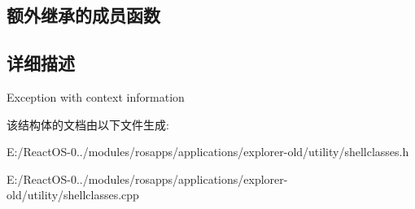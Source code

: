 \subsection*{额外继承的成员函数}


\subsection{详细描述}
Exception with context information 

该结构体的文档由以下文件生成\+:\begin{DoxyCompactItemize}
\item 
E\+:/\+React\+O\+S-\/0../modules/rosapps/applications/explorer-\/old/utility/shellclasses.\+h\item 
E\+:/\+React\+O\+S-\/0../modules/rosapps/applications/explorer-\/old/utility/shellclasses.\+cpp\end{DoxyCompactItemize}
